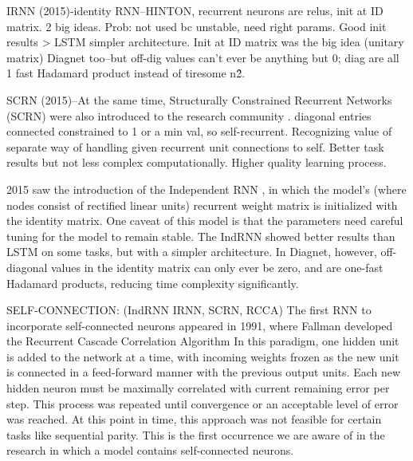 \documentclass{article}
\begin{document}
IRNN (2015)-identity RNN--HINTON, recurrent neurons are relus, init at ID matrix. 2 big ideas. Prob: not used bc unstable, need right params.  Good init results > LSTM simpler architecture. Init at ID matrix was the big idea (unitary matrix) Diagnet too--but off-dig values can't ever be anything but 0; diag are all 1 fast Hadamard product instead of tiresome n\^2. 

SCRN (2015)--At the same time, Structurally Constrained Recurrent Networks (SCRN) were also introduced to the research community \citet{MikolovJCMR14}. diagonal entries connected constrained to 1 or a min val, so self-recurrent.  Recognizing value of separate way of handling given recurrent unit connections to self.  Better task results but not less complex computationally. Higher quality learning process.

2015 saw the introduction of the Independent RNN \citet{LeJH15}, in which the model's (where nodes consist of rectified linear units) recurrent weight matrix is initialized with the identity matrix.  One caveat of this model is that the parameters need careful tuning for the model to remain stable.  The IndRNN showed better results than LSTM on some tasks, but with a simpler architecture.  In Diagnet, however, off-diagonal values in the identity matrix can only ever be zero, and are one-fast Hadamard products, reducing time complexity significantly. 





SELF-CONNECTION: (IndRNN IRNN, SCRN, RCCA) 
The first RNN to incorporate self-connected neurons appeared in 1991, where Fallman developed the Recurrent Cascade Correlation Algorithm \citet{Fahlman1990TheRC}  In this paradigm, one hidden unit is added to the network at a time, with incoming weights frozen as the new unit is connected in a feed-forward manner with the previous output units. Each new hidden neuron must be maximally correlated with current remaining error per step.  This process was repeated until convergence or an acceptable level of error was reached.  At this point in time, this approach was not feasible for certain tasks like sequential parity.  This is the first occurrence we are aware of in the research in which a model contains self-connected neurons.  
\end{document}
